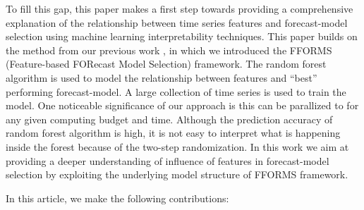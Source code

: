 \documentclass[11pt,a4paper,]{article}
\begin{document}
To fill this gap, this paper makes a first step towards providing a
comprehensive explanation of the relationship between time series
features and forecast-model selection using machine learning
interpretability techniques. This paper builds on the method from our
previous work \textcite{fforms}, in which we introduced the FFORMS
(Feature-based FORecast Model Selection) framework. The random forest
algorithm is used to model the relationship between features and
``best'' performing forecast-model. A large collection of time series is
used to train the model. One noticeable significance of our approach is
this can be parallized to for any given computing budget and time.
Although the prediction accuracy of random forest algorithm is high, it
is not easy to interpret what is happening inside the forest because of
the two-step randomization. In this work we aim at providing a deeper
understanding of influence of features in forecast-model selection by
exploiting the underlying model structure of FFORMS framework.

In this article, we make the following contributions:
\end{document}
